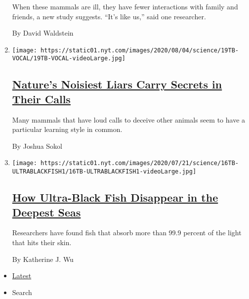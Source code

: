 \begin{enumerate}
  When these mammals are ill, they have fewer interactions with family
  and friends, a new study suggests. ``It's like us,'' said one
  researcher.

  By David Waldstein
\item
  \texttt{[image: https://static01.nyt.com/images/2020/08/04/science/19TB-VOCAL/19TB-VOCAL-videoLarge.jpg]}

  \hypertarget{natures-noisiest-liars-carry-secrets-in-their-calls}{%
  \subsection{\texorpdfstring{\href{/2020/07/21/science/mammals-vocal-learning.html}{Nature's
  Noisiest Liars Carry Secrets in Their
  Calls}}{Nature's Noisiest Liars Carry Secrets in Their Calls}}\label{natures-noisiest-liars-carry-secrets-in-their-calls}}

  Many mammals that have loud calls to deceive other animals seem to
  have a particular learning style in common.

  By Joshua Sokol
\item
  \texttt{[image: https://static01.nyt.com/images/2020/07/21/science/16TB-ULTRABLACKFISH1/16TB-ULTRABLACKFISH1-videoLarge.jpg]}

  \hypertarget{how-ultra-black-fish-disappear-in-the-deepest-seas}{%
  \subsection{\texorpdfstring{\href{/2020/07/16/science/ultra-black-fish.html}{How
  Ultra-Black Fish Disappear in the Deepest
  Seas}}{How Ultra-Black Fish Disappear in the Deepest Seas}}\label{how-ultra-black-fish-disappear-in-the-deepest-seas}}

  Researchers have found fish that absorb more than 99.9 percent of the
  light that hits their skin.

  By Katherine J. Wu
\end{enumerate}

\begin{itemize}
\tightlist
\item
  \protect\hyperlink{stream-panel}{Latest}
\item
  Search
\end{itemize}

